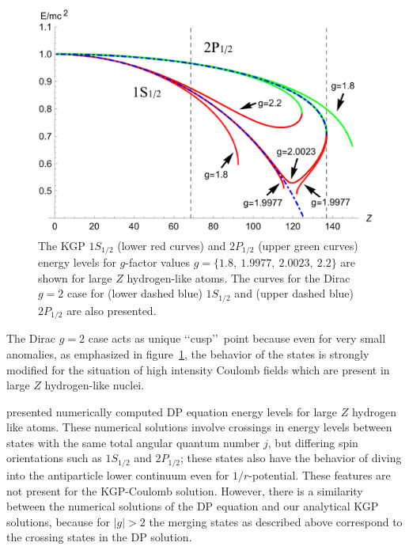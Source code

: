 \begin{figure}[ht]
    \centering
    \includegraphics[width=\linewidth]{plots/chap02moment/lanplot08.pdf}
     \caption{The KGP $1S_{1/2}$ (lower red curves) and $2P_{1/2}$ (upper green curves) energy levels for $g$-factor values $g\!=\!\{1.8,\ 1.9977,\ 2.0023,\ 2.2\}$ are shown for large $Z$ hydrogen-like atoms. The curves for the Dirac $g\!=\!2$ case for (lower dashed blue) $1S_{1/2}$ and (upper dashed blue) $2P_{1/2}$ are also presented.}
    \label{f03}
\end{figure}

The Dirac $g\!=\!2$ case acts as unique \lq\lq cusp\rq\rq\ point because even for very small anomalies, as emphasized in figure~\ref{f03}, the behavior of the states is strongly modified for the situation of high intensity Coulomb fields which are present in large $Z$ hydrogen-like nuclei.

\cite{Thaller:1992ji} presented numerically computed DP equation energy levels for large $Z$ hydrogen like atoms. These numerical solutions involve crossings in energy levels between states with the same total angular quantum number $j$, but differing spin orientations such as $1S_{1/2}$ and $2P_{1/2}$; these states also have the behavior of diving into the antiparticle lower continuum even for $1/r$-potential. These features are not present for the KGP-Coulomb solution. However, there is a similarity between the numerical solutions of the DP equation and our analytical KGP solutions, because for $|g|>2$ the merging states as described above correspond to the crossing states in the DP solution.

